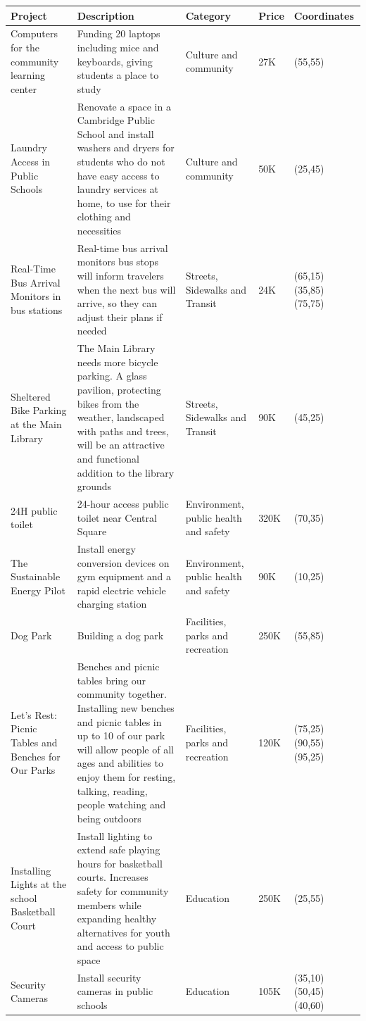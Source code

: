 \documentclass[runningheads]{llncs}
\begin{document}
\begin{longtable}[ht!]{|p{2cm}|p{6cm}|p{3cm}|p{1cm}|p{2.5cm}|}
    \hline
    \textbf{Project} & \textbf{Description} & \textbf{Category} & \textbf{Price} & \textbf{Coordinates}\\
    \hline
    Computers for the community learning center & Funding 20 laptops including mice and keyboards, giving students a place to study & Culture and community &  27K & (55,55)\\
    \hline
    Laundry Access in Public Schools & Renovate a space in a Cambridge Public School and install washers and dryers for students who do not have easy access to laundry services at home, to use for their clothing and necessities & Culture and community & 50K & (25,45)\\
    \hline
    Real-Time Bus Arrival Monitors in bus stations & Real-time bus arrival monitors bus stops will inform travelers when the next bus will arrive, so they can adjust their plans if needed &  Streets, Sidewalks and Transit &  24K & (65,15) (35,85) (75,75)\\
    \hline
    Sheltered Bike Parking at the Main Library & The Main Library needs more bicycle parking. A glass pavilion, protecting bikes from the weather, landscaped with paths and trees, will be an attractive and functional addition to the library grounds & Streets, Sidewalks and Transit & 90K & (45,25)\\
    \hline
    24H public toilet & 24-hour access public toilet near Central Square & Environment, public health and safety & 320K & (70,35)\\
    \hline
    The Sustainable Energy Pilot & Install energy conversion devices on gym equipment and a rapid electric vehicle charging station & Environment, public health and safety & 90K & (10,25)\\
    \hline
    Dog Park & Building a dog park & Facilities, parks and recreation & 250K & (55,85)\\
    \hline
    Let’s Rest: Picnic Tables and Benches for Our Parks & Benches and picnic tables bring our community together. Installing new benches and picnic tables in up to 10 of our park will allow people of all ages and abilities to enjoy them for resting, talking, reading, people watching and being outdoors & Facilities, parks and recreation & 120K & (75,25) (90,55) (95,25)\\
    \hline
    Installing Lights at the school Basketball Court & Install lighting to extend safe playing hours for basketball courts. Increases safety for community members while expanding healthy alternatives for youth and access to public space & Education & 250K & (25,55)\\
    \hline
    Security Cameras & Install security cameras in public schools & Education & 105K & (35,10) (50,45) (40,60)\\
        

\end{longtable}
\end{document}

